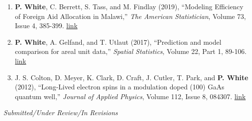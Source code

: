 \documentclass[11pt]{article}
\begin{document}
\begin{enumerate}[label=$\bullet$]
\item \textbf{P. White}, C. Berrett, S. Tass, and M. Findlay (2019), ``Modeling Efficiency of Foreign Aid Allocation in Malawi,'' \emph{The American Statistician}, Volume 73, Issue 4, 385-399.  \href{https://www.tandfonline.com/doi/full/10.1080/00031305.2018.1470032}{link}
\item \textbf{P. White}, A. Gelfand, and T. Utlaut (2017), ``Prediction and model comparison for areal unit data,'' \emph{Spatial Statistics}, Volume 22, Part 1, 89-106. \href{http://www.sciencedirect.com/science/article/pii/S2211675317301422}{link}
\item J. S. Colton, D. Meyer, K. Clark, D. Craft, J. Cutler, T. Park, and \textbf{P. White} (2012), ``Long-Lived electron spins in a modulation doped (100) GaAs quantum well,'' \emph{Journal of Applied Physics}, Volume 112, Issue 8, 084307.  \href{http://aip.scitation.org/doi/abs/10.1063/1.4759320}{link}
\end{enumerate}

\emph{Submitted/Under Review/In Revisions}
\end{document}

